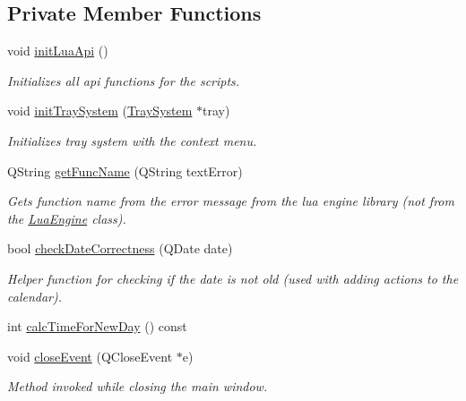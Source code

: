 \subsection*{Private Member Functions}
\begin{DoxyCompactItemize}
\item 
void \hyperlink{classmain_win_a9c0cfda2b24fa6259874caf7ccd4b908}{init\-Lua\-Api} ()
\begin{DoxyCompactList}\small\item\em Initializes all api functions for the scripts. \end{DoxyCompactList}\item 
void \hyperlink{classmain_win_aaf15be9a17be251351b2bde08dcb2c21}{init\-Tray\-System} (\hyperlink{class_tray_system}{Tray\-System} $\ast$tray)
\begin{DoxyCompactList}\small\item\em Initializes tray system with the context menu. \end{DoxyCompactList}\item 
Q\-String \hyperlink{classmain_win_ab00961de109eaf86fceed0dc39d53fe8}{get\-Func\-Name} (Q\-String text\-Error)
\begin{DoxyCompactList}\small\item\em Gets function name from the error message from the lua engine library (not from the \hyperlink{class_lua_engine}{Lua\-Engine} class). \end{DoxyCompactList}\item 
bool \hyperlink{classmain_win_a2e729670f337c9017dbfae89c2a1a0a5}{check\-Date\-Correctness} (Q\-Date date)
\begin{DoxyCompactList}\small\item\em Helper function for checking if the date is not old (used with adding actions to the calendar). \end{DoxyCompactList}\item 
int \hyperlink{classmain_win_a63293c7cdab54cf78b86e7c69a3bff7a}{calc\-Time\-For\-New\-Day} () const 
\item 
void \hyperlink{classmain_win_add27401cb9db131bbe76cb9501bdd500}{close\-Event} (Q\-Close\-Event $\ast$e)
\begin{DoxyCompactList}\small\item\em Method invoked while closing the main window. \end{DoxyCompactList}\end{DoxyCompactItemize}
